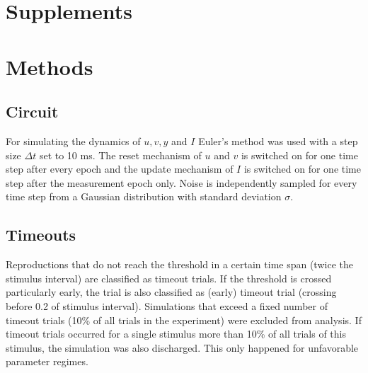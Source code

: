 \documentclass[10pt]{article}
\begin{document}
\pagebreak
\setcounter{section}{0}
\section*{Supplements}
\setcounter{figure}{0}
\setcounter{table}{0}
\setcounter{equation}{0} 
\renewcommand{\figurename}{Supplementary Figure}
\renewcommand{\tablename}{Supplementary Table}

\section{Methods}
\subsection*{Circuit}
For simulating the dynamics of $u, v, y$ and $I$ Euler's method was used with a step size $\Delta t$ set to 10 ms.
The reset mechanism of $u$ and $v$ is switched on for one time step after every epoch and the update mechanism of $I$ is switched on for one time step after the measurement epoch only.
Noise is independently sampled for every time step from a Gaussian distribution with standard deviation $\sigma$.

\subsection*{Timeouts}
Reproductions that do not reach the threshold in a certain time span (twice the stimulus interval) are classified as timeout trials. 
If the threshold is crossed particularly early, the trial is also classified as (early) timeout trial (crossing before 0.2 of stimulus interval).
Simulations that exceed a fixed number of timeout trials (10\% of all trials in the experiment) were excluded from analysis. If timeout trials occurred for a single stimulus more than 10\% of all trials of this stimulus, the simulation was also discharged.
This only happened for unfavorable parameter regimes.
\end{document}
